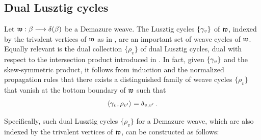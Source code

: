 \subsection{Dual Lusztig cycles}\label{sssec:dual_Lusztigcycles} Let $\mathfrak{w}:\beta\longrightarrow\delta(\beta)$ be a Demazure weave. The Lusztig cycles $\{\gamma_v\}$ of $\mathfrak{w}$, indexed by the trivalent vertices of $\mathfrak{w}$ as in , are an important set of weave cycles of $\mathfrak{w}$. Equally relevant is the dual collection $\{\rho_v\}$ of dual Lusztig cycles, dual with respect to the intersection product introduced in . In fact, given $\{\gamma_v\}$ and the skew-symmetric product, it follows from induction and the normalized propagation rules that there exists a distinguished family of weave cycles $\{\rho_v\}$ that vanish at the bottom boundary of $\mathfrak{w}$ such that
\begin{equation}\label{eq:duality}
\langle \gamma_v,\rho_{v'}\rangle =\delta_{v,v'}\,.
\end{equation}

\noindent Specifically, such dual Lusztig cycles $\{\rho_v\}$ for a Demazure weave, which are also indexed by the trivalent vertices of $\mathfrak{w}$, can be constructed as follows:


